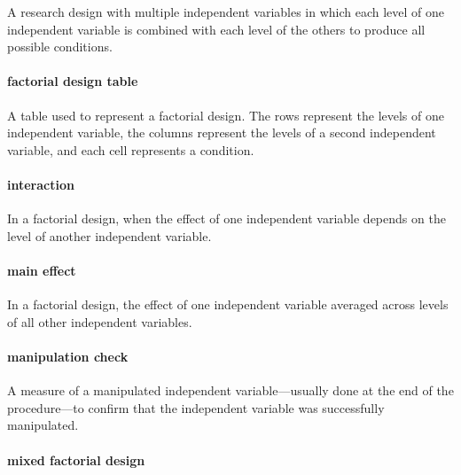 \documentclass[
]{krantz}
\begin{document}
A research design with multiple independent variables in which each level of one independent variable is combined with each level of the others to produce all possible conditions.

\hypertarget{factorial-design-table}{%
\paragraph*{factorial design table}\label{factorial-design-table}}

A table used to represent a factorial design. The rows represent the levels of one independent variable, the columns represent the levels of a second independent variable, and each cell represents a condition.

\hypertarget{interaction}{%
\paragraph*{interaction}\label{interaction}}

In a factorial design, when the effect of one independent variable depends on the level of another independent variable.

\hypertarget{main-effect}{%
\paragraph*{main effect}\label{main-effect}}

In a factorial design, the effect of one independent variable averaged across levels of all other independent variables.

\hypertarget{manipulation-check-1}{%
\paragraph*{manipulation check}\label{manipulation-check-1}}

A measure of a manipulated independent variable---usually done at the end of the procedure---to confirm that the independent variable was successfully manipulated.

\hypertarget{mixed-factorial-design}{%
\paragraph*{mixed factorial design}\label{mixed-factorial-design}}
\end{document}
